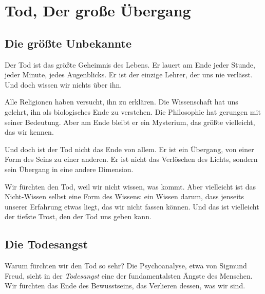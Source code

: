 
\chapter{Tod, Der große Übergang}

\section{Die größte Unbekannte}

Der Tod ist das größte Geheimnis des Lebens. Er lauert am Ende jeder Stunde, jeder Minute, jedes Augenblicks. Er ist der einzige Lehrer, der uns nie verlässt. Und doch wissen wir nichts über ihn.

Alle Religionen haben versucht, ihn zu erklären. Die Wissenschaft hat uns gelehrt, ihn als biologisches Ende zu verstehen. Die Philosophie hat gerungen mit seiner Bedeutung. Aber am Ende bleibt er ein Mysterium, das größte vielleicht, das wir kennen.

Und doch ist der Tod nicht das Ende von allem. Er ist ein Übergang, von einer Form des Seins zu einer anderen. Er ist nicht das Verlöschen des Lichts, sondern sein Übergang in eine andere Dimension.

Wir fürchten den Tod, weil wir nicht wissen, was kommt. Aber vielleicht ist das Nicht-Wissen selbst eine Form des Wissens: ein Wissen darum, dass jenseits unserer Erfahrung etwas liegt, das wir nicht fassen können. Und das ist vielleicht der tiefste Trost, den der Tod uns geben kann.

\section{Die Todesangst}

Warum fürchten wir den Tod so sehr? Die Psychoanalyse, etwa von Sigmund Freud, sieht in der \emph{Todesangst} eine der fundamentalsten Ängste des Menschen. Wir fürchten das Ende des Bewusstseins, das Verlieren dessen, was wir sind.

